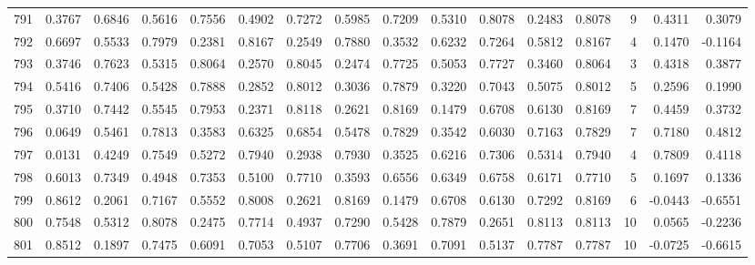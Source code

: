 \begin{tabular}{lrrrrrrrrrrrrrrr}
791 &      0.3767 &  0.6846 &  0.5616 &  0.7556 &  0.4902 &  0.7272 &  0.5985 &  0.7209 &  0.5310 &  0.8078 &   0.2483 &     0.8078 &      9 &                    0.4311 &                     0.3079 \\
792 &      0.6697 &  0.5533 &  0.7979 &  0.2381 &  0.8167 &  0.2549 &  0.7880 &  0.3532 &  0.6232 &  0.7264 &   0.5812 &     0.8167 &      4 &                    0.1470 &                    -0.1164 \\
793 &      0.3746 &  0.7623 &  0.5315 &  0.8064 &  0.2570 &  0.8045 &  0.2474 &  0.7725 &  0.5053 &  0.7727 &   0.3460 &     0.8064 &      3 &                    0.4318 &                     0.3877 \\
794 &      0.5416 &  0.7406 &  0.5428 &  0.7888 &  0.2852 &  0.8012 &  0.3036 &  0.7879 &  0.3220 &  0.7043 &   0.5075 &     0.8012 &      5 &                    0.2596 &                     0.1990 \\
795 &      0.3710 &  0.7442 &  0.5545 &  0.7953 &  0.2371 &  0.8118 &  0.2621 &  0.8169 &  0.1479 &  0.6708 &   0.6130 &     0.8169 &      7 &                    0.4459 &                     0.3732 \\
796 &      0.0649 &  0.5461 &  0.7813 &  0.3583 &  0.6325 &  0.6854 &  0.5478 &  0.7829 &  0.3542 &  0.6030 &   0.7163 &     0.7829 &      7 &                    0.7180 &                     0.4812 \\
797 &      0.0131 &  0.4249 &  0.7549 &  0.5272 &  0.7940 &  0.2938 &  0.7930 &  0.3525 &  0.6216 &  0.7306 &   0.5314 &     0.7940 &      4 &                    0.7809 &                     0.4118 \\
798 &      0.6013 &  0.7349 &  0.4948 &  0.7353 &  0.5100 &  0.7710 &  0.3593 &  0.6556 &  0.6349 &  0.6758 &   0.6171 &     0.7710 &      5 &                    0.1697 &                     0.1336 \\
799 &      0.8612 &  0.2061 &  0.7167 &  0.5552 &  0.8008 &  0.2621 &  0.8169 &  0.1479 &  0.6708 &  0.6130 &   0.7292 &     0.8169 &      6 &                   -0.0443 &                    -0.6551 \\
800 &      0.7548 &  0.5312 &  0.8078 &  0.2475 &  0.7714 &  0.4937 &  0.7290 &  0.5428 &  0.7879 &  0.2651 &   0.8113 &     0.8113 &     10 &                    0.0565 &                    -0.2236 \\
801 &      0.8512 &  0.1897 &  0.7475 &  0.6091 &  0.7053 &  0.5107 &  0.7706 &  0.3691 &  0.7091 &  0.5137 &   0.7787 &     0.7787 &     10 &                   -0.0725 &                    -0.6615 \\

\end{tabular}
